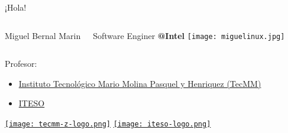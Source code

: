 
\begin{frame}[c]{¡Hola!}

  \begin{columns}
      Miguel Bernal Marin

      \vspace{\baselineskip}
      Software Enginer \textbf{@Intel}
      \texttt{[image: miguelinux.jpg]}
  \end{columns}

  Profesor:
  \begin{itemize}
    \item \href{http://tecmm.edu.mx/}{Instituto Tecnológico Mario
      Molina Pasquel y Henriquez (TecMM)}
    \item \href{https://iteso.mx/}{ITESO}
  \end{itemize}

  \begin{center}
    \href{http://tecmm.edu.mx/}{\texttt{[image: tecmm-z-logo.png]}}
    \hspace{2cm}
    \href{https://iteso.mx/}{\texttt{[image: iteso-logo.png]}}
  \end{center}
\end{frame}
